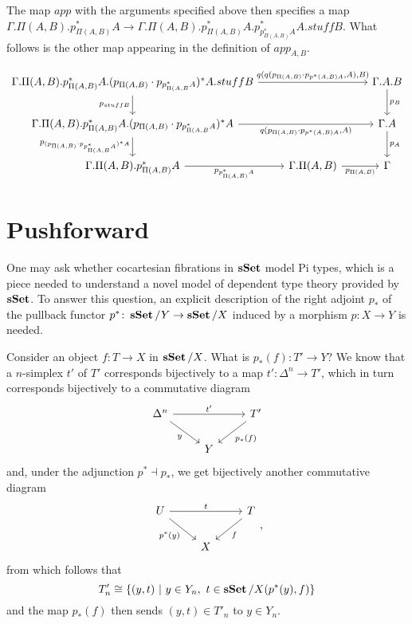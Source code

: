 \documentclass[a4paper,12pt]{scrartcl}
\begin{document}
The map $app$ with the arguments specified above then specifies a map
$\Gamma.\Pi(A,B).p^*_{\Pi(A,B)}A\rightarrow\Gamma.\Pi(A,B).p^*_{\Pi(A,B)}A.p^*_{p^*_{\Pi(A,B)}A}A.stuffB$.
What follows is the other map appearing in the definition of $app_{A,B}$.

\[\begin{tikzcd}
	{\Gamma.\Pi(A,B).p^*_{\Pi(A,B)}A.(p_{\Pi(A,B)}\cdot p_{p^*_{\Pi(A,B}A})^*A.stuffB} && {\Gamma.A.B} \\
	{\Gamma.\Pi(A,B).p^*_{\Pi(A,B)}A.(p_{\Pi(A,B)}\cdot p_{p^*_{\Pi(A,B}A})^*A} && {\Gamma.A} \\
	{\Gamma.\Pi(A,B).p^*_{\Pi(A,B)}A} & {\Gamma.\Pi(A,B)} & \Gamma
	\arrow["{q(q(p_{\Pi(A,B)}\cdot p_{p^*(A,B)A},A),B)}", from=1-1, to=1-3]
	\arrow["{p_B}", from=1-3, to=2-3]
	\arrow["{p_A}", from=2-3, to=3-3]
	\arrow["{p_{\Pi(A,B)}}"', from=3-2, to=3-3]
	\arrow["{p_{p^*_{\Pi(A,B)}A}}"', from=3-1, to=3-2]
	\arrow["{q(p_{\Pi(A,B)}\cdot p_{p^*(A,B)A},A)}"', from=2-1, to=2-3]
	\arrow["{p_{(p_{\Pi(A,B)}\cdot p_{p^*_{\Pi(A,B}A})^*A}}"', from=2-1, to=3-1]
	\arrow["{p_{stuffB}}"', from=1-1, to=2-1]
\end{tikzcd}\]

\section{Pushforward}

One may ask whether cocartesian fibrations in $\operatorname{\mathbf{sSet}}$ model Pi types, which is a
piece needed to understand a novel model of dependent type theory provided by
$\operatorname{\mathbf{sSet}}$. To answer this question, an explicit description of the right adjoint
$p_*$ of the pullback functor $p^*\colon\operatorname{\mathbf{sSet}}/Y\rightarrow\operatorname{\mathbf{sSet}}/X$ induced by a
morphism $p\colon X\rightarrow Y$ is needed.

Consider an object $f\colon T\rightarrow X$ in $\operatorname{\mathbf{sSet}}/X$. What is $p_*(f)\colon
T'\rightarrow Y$? We know that a $n$-simplex $t'$ of $T'$ corresponds
bijectively to a map $t'\colon\Delta^n\rightarrow T'$, which in turn corresponds
bijectively to a commutative diagram
\[\begin{tikzcd}
	{\Delta^n} & {} & {T'} \\
	& Y
	\arrow["{t'}", from=1-1, to=1-3]
	\arrow["y"', from=1-1, to=2-2]
	\arrow["{p_*(f)}", from=1-3, to=2-2]
\end{tikzcd}\]
and, under the adjunction $p^*\dashv p_*$, we get bijectively another
commutative diagram
\[\begin{tikzcd}
	U & {} & T \\
	& X
	\arrow["t", from=1-1, to=1-3]
	\arrow["{p^*(y)}"', from=1-1, to=2-2]
	\arrow["f", from=1-3, to=2-2]
\end{tikzcd},\]
from which follows that
\[T'_n\cong\{(y,t)\ |\ y\in Y_n,\ t\in\sSet/X(p^*(y),f)\}\]
and the map $p_*(f)$ then sends $(y,t)\in T'_n$ to $y\in Y_n$.
\end{document}
